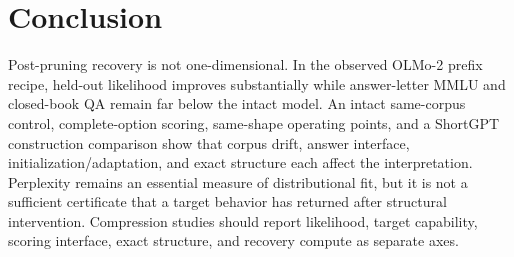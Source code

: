 \section{Conclusion}
\label{sec:conclusion}

Post-pruning recovery is not one-dimensional. In the observed OLMo-2 prefix
recipe, held-out likelihood improves substantially while answer-letter MMLU and
closed-book QA remain far below the intact model. An intact same-corpus control,
complete-option scoring, same-shape operating points, and a ShortGPT
construction comparison show that corpus drift, answer interface,
initialization/adaptation, and exact structure each affect the interpretation.
Perplexity remains an
essential measure of distributional fit, but it is not a sufficient certificate
that a target behavior has returned after structural intervention. Compression
studies should report likelihood, target capability, scoring interface, exact
structure, and recovery compute as separate axes.
